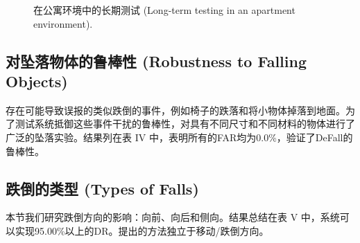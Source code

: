 \documentclass[journal]{IEEEtran}
\begin{document}
\begin{figure}[htbp]
\centering
\vspace{3cm} %
\caption{在公寓环境中的长期测试 (Long-term testing in an apartment environment).}
\end{figure}

\subsection{对坠落物体的鲁棒性 (Robustness to Falling Objects)}
存在可能导致误报的类似跌倒的事件，例如椅子的跌落和将小物体掉落到地面。为了测试系统抵御这些事件干扰的鲁棒性，对具有不同尺寸和不同材料的物体进行了广泛的坠落实验。结果列在表 IV 中，表明所有的FAR均为0.0\%，验证了DeFall的鲁棒性。

\begin{table}[htbp]
\centering
\caption{坠落物体的影响 (IMPACT OF FALLING OBJECTS)}
\end{table}

\subsection{跌倒的类型 (Types of Falls)}
本节我们研究跌倒方向的影响：向前、向后和侧向。结果总结在表 V 中，系统可以实现95.00\%以上的DR。提出的方法独立于移动/跌倒方向。
\end{document}
